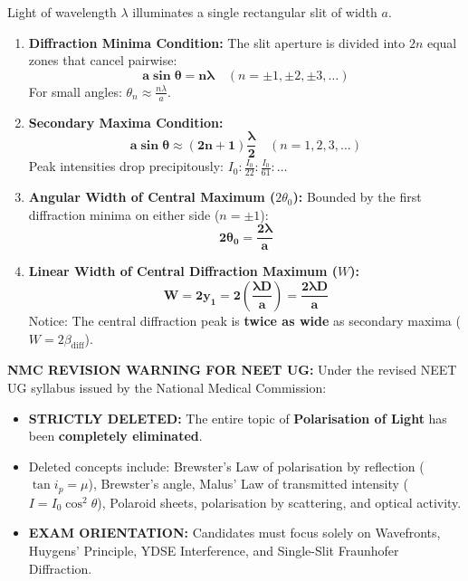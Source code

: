 \documentclass[10pt,twoside,openright]{book}
\begin{document}
\begin{formulabox}
Light of wavelength $\lambda$ illuminates a single rectangular slit of width $a$.
\begin{enumerate}
  \item \textbf{Diffraction Minima Condition:}
  The slit aperture is divided into $2n$ equal zones that cancel pairwise:
  \begin{equation}
    \mathbf{a \sin\theta = n \lambda} \quad (n = \pm 1, \pm 2, \pm 3, \dots)
  \end{equation}
  For small angles: $\theta_n \approx \frac{n\lambda}{a}$.
  \item \textbf{Secondary Maxima Condition:}
  \begin{equation}
    \mathbf{a \sin\theta \approx (2n+1)\frac{\lambda}{2}} \quad (n = 1, 2, 3, \dots)
  \end{equation}
  Peak intensities drop precipitously: $I_0 : \frac{I_0}{22} : \frac{I_0}{61} : \dots$
  \item \textbf{Angular Width of Central Maximum ($2\theta_0$):}
  Bounded by the first diffraction minima on either side ($n = \pm 1$):
  \begin{equation}
    \mathbf{2\theta_0 = \frac{2\lambda}{a}}
  \end{equation}
  \item \textbf{Linear Width of Central Diffraction Maximum ($W$):}
  \begin{equation}
    \mathbf{W = 2 y_1 = 2 \left(\frac{\lambda D}{a}\right) = \frac{2\lambda D}{a}}
  \end{equation}
  Notice: The central diffraction peak is \textbf{twice as wide} as secondary maxima ($W = 2\beta_{\text{diff}}$).
\end{enumerate}
\end{formulabox}

\begin{trapbox}
\textbf{NMC REVISION WARNING FOR NEET UG:}
Under the revised NEET UG syllabus issued by the National Medical Commission:
\begin{itemize}
  \item \textbf{STRICTLY DELETED:} The entire topic of \textbf{Polarisation of Light} has been \textbf{completely eliminated}.
  \item Deleted concepts include: Brewster's Law of polarisation by reflection ($\tan i_p = \mu$), Brewster's angle, Malus' Law of transmitted intensity ($I = I_0 \cos^2\theta$), Polaroid sheets, polarisation by scattering, and optical activity.
  \item \textbf{EXAM ORIENTATION:} Candidates must focus solely on Wavefronts, Huygens' Principle, YDSE Interference, and Single-Slit Fraunhofer Diffraction.
\end{itemize}
\end{trapbox}
\end{document}
